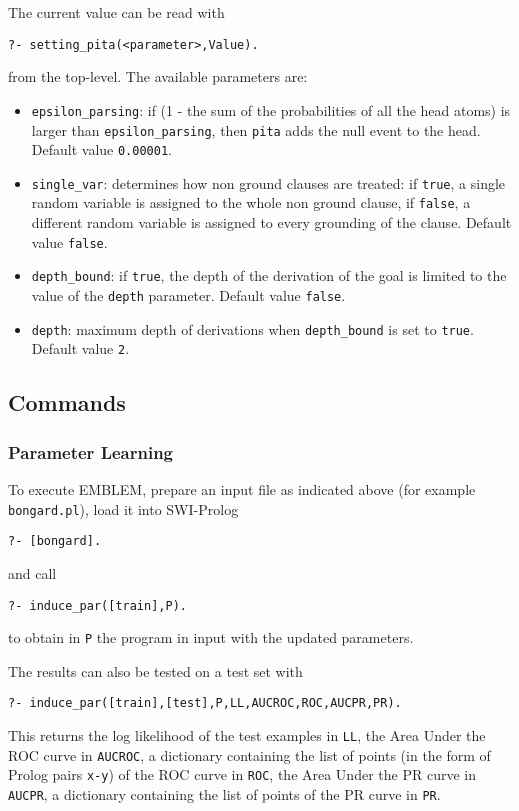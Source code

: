 \documentclass[a4paper,10pt]{article}
\begin{document}
The current value can be read with
\begin{verbatim}
?- setting_pita(<parameter>,Value).
\end{verbatim}
from the top-level.
The available parameters are:
\begin{itemize}
\item 
	 \verb|epsilon_parsing|: if (1 - the sum of the probabilities of all the head atoms) is larger than 
    \verb|epsilon_parsing|,
		then \texttt{pita} adds the null event to the head. Default value \texttt{0.00001}.
\item \verb|single_var|: determines how non ground clauses are treated: if \texttt{true}, a single random variable is assigned to the whole non ground clause, 
if \texttt{false}, a different random variable is assigned to every grounding of the clause. Default value \texttt{false}.
\item \verb|depth_bound|: if \texttt{true}, the depth of the derivation of the goal is limited to the value of the \texttt{depth} parameter.  Default value \texttt{false}.
\item  \texttt{depth}: maximum depth of derivations when  \verb|depth_bound| is set to \texttt{true}. Default value \texttt{2}.
\end{itemize}








\subsection{Commands}
\subsubsection{Parameter Learning}
To execute EMBLEM, prepare an input file as indicated above 
(for example \verb|bongard.pl|), load it into SWI-Prolog
\begin{verbatim}
?- [bongard].
\end{verbatim}
and call
\begin{verbatim}
?- induce_par([train],P).
\end{verbatim}
to obtain in \verb|P| the program in input with the updated parameters.

The results can also be tested on a test set with
\begin{verbatim}
?- induce_par([train],[test],P,LL,AUCROC,ROC,AUCPR,PR).
\end{verbatim}
This returns the log likelihood of the test examples in \verb|LL|, the Area Under the ROC curve in \verb|AUCROC|, a dictionary containing the list of points (in the form of Prolog pairs \verb|x-y|) of the ROC curve in \verb|ROC|,
the Area Under the PR curve in \verb|AUCPR|, a dictionary containing the list of points of the PR curve in \verb|PR|.
\end{document}
